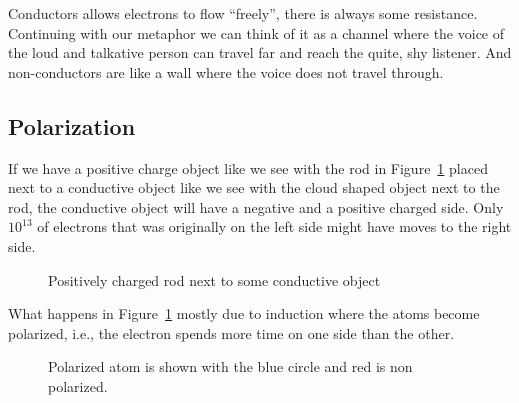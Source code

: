 Conductors allows electrons to flow ``freely'', there is always some resistance. Continuing with our metaphor we can think of it as a channel where the voice of the loud and talkative person can travel far and reach the quite, shy listener. And non-conductors are like a wall where the voice does not travel through.

\subsection{Polarization}

If we have a positive charge object like we see with the rod in Figure~\ref{fig:charged-rod} placed next to a conductive object like we see with the cloud shaped object next to the rod, the conductive object will have a negative and a positive charged side. Only $10^{13}$ of electrons that was originally on the left side might have moves to the right side.

\begin{figure}[H]
\centering
{}
  \caption{Positively charged rod next to some conductive object}
  \label{fig:charged-rod}
\end{figure}

What happens in Figure~\ref{fig:charged-rod} mostly due to induction where the atoms become polarized, i.e., the electron spends more time on one side than the other.
\begin{figure}[H]
\centering
{}
  \caption{Polarized atom is shown with the blue circle and red is non polarized.}
  \label{fig:polarized-atom}
\end{figure}

